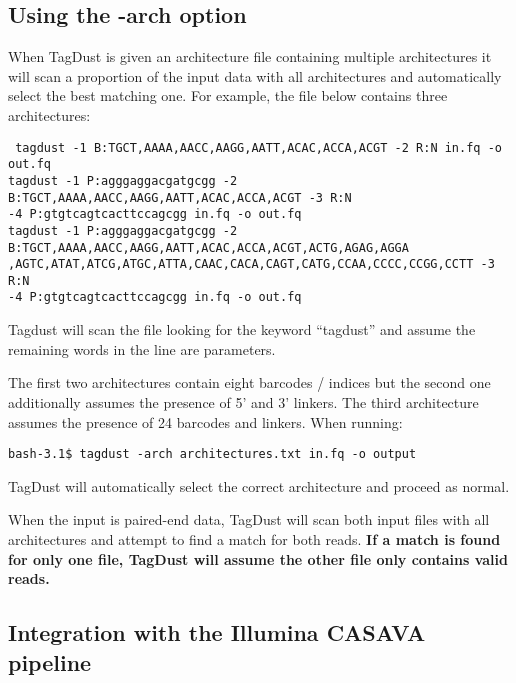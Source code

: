 \documentclass[11pt,a4paper,oneside]{book}
\begin{document}
\subsection{Using the -arch option}\label{arch}

When TagDust is given an architecture file containing multiple architectures it will scan a proportion of the  input data with all architectures and automatically select the best matching one. For example, the file below contains three architectures:

\vspace{5mm}

{\small \tt
tagdust -1 B:TGCT,AAAA,AACC,AAGG,AATT,ACAC,ACCA,ACGT -2 R:N in.fq -o out.fq \\
tagdust -1 P:agggaggacgatgcgg -2 B:TGCT,AAAA,AACC,AAGG,AATT,ACAC,ACCA,ACGT -3 R:N \\ -4 P:gtgtcagtcacttccagcgg in.fq -o out.fq\\
tagdust -1 P:agggaggacgatgcgg -2 B:TGCT,AAAA,AACC,AAGG,AATT,ACAC,ACCA,ACGT,ACTG,AGAG,AGGA\\,AGTC,ATAT,ATCG,ATGC,ATTA,CAAC,CACA,CAGT,CATG,CCAA,CCCC,CCGG,CCTT -3 R:N \\ -4 P:gtgtcagtcacttccagcgg in.fq -o out.fq\\
}

\vspace{5mm}

Tagdust will scan the file looking for the keyword ``tagdust'' and assume the remaining words in the line are parameters. 

The first two architectures contain eight barcodes / indices but the second one additionally assumes the presence of 5' and 3' linkers. The third architecture assumes the presence of 24 barcodes and linkers. When running: 

\begin{verbatim}
bash-3.1$ tagdust -arch architectures.txt in.fq -o output
\end{verbatim}

TagDust will automatically select the correct architecture and proceed as normal. 

When the input is paired-end data, TagDust will scan both input files with all architectures and attempt to find a match for both reads. {\bf If a match is found for only one file, TagDust will assume the other file only contains valid reads. }


\subsection{Integration with the Illumina CASAVA pipeline}\label{illuminadata}
\end{document}
